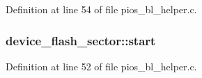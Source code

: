 Definition at line 54 of file pios\-\_\-bl\-\_\-helper.\-c.

\hypertarget{group___p_i_o_s___b_o_o_t_l_o_a_d_e_r_ga8efbeb4ac8f39002737374387a063360}{
\subsubsection[{start}]{ device\-\_\-flash\-\_\-sector\-::start}}\label{group___p_i_o_s___b_o_o_t_l_o_a_d_e_r_ga8efbeb4ac8f39002737374387a063360}


Definition at line 52 of file pios\-\_\-bl\-\_\-helper.\-c.

